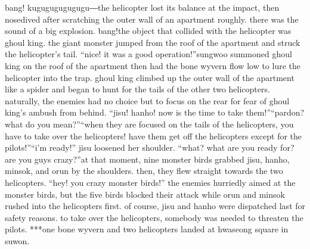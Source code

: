 bang! kugugugugugugu―the helicopter lost its balance at the impact, then nosedived after scratching the outer wall of an apartment roughly.
 there was the sound of a big explosion.
bang!the object that collided with the helicopter was ghoul king.
the giant monster jumped from the roof of the apartment and struck the helicopter’s tail.
“nice! it was a good operation!”sungwoo summoned ghoul king on the roof of the apartment then had the bone wyvern flow low to lure the helicopter into the trap.
ghoul king climbed up the outer wall of the apartment like a spider and began to hunt for the tails of the other two helicopters.
 naturally, the enemies had no choice but to focus on the rear for fear of ghoul king’s ambush from behind.
“jisu! hanho! now is the time to take them!”“pardon? what do you mean?”“when they are focused on the tails of the helicopters, you have to take over the helicopters! have them get off the helicopters except for the pilots!”“i’m ready!” jisu loosened her shoulder.
“what? what are you ready for? are you guys crazy?”at that moment, nine monster birds grabbed jisu, hanho, minsok, and orun by the shoulders.
 then, they flew straight towards the two helicopters.
“hey! you crazy monster birds!” the enemies hurriedly aimed at the monster birds, but the five birds blocked their attack while orun and minsok rushed into the helicopters first.
of course, jisu and hanho were dispatched last for safety reasons.
 to take over the helicopters, somebody was needed to threaten the pilots.
***one bone wyvern and two helicopters landed at hwaseong square in suwon.

